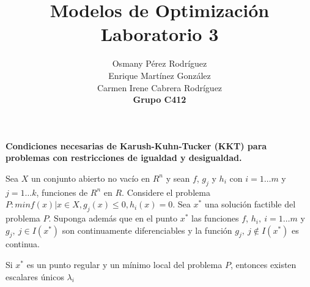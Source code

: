 \documentclass[titlepage, 11pt]{scrartcl}
\title{
    \normalfont\normalsize
    {\huge Modelos de Optimización\\
    		\textbf{Laboratorio 3}}
    \vspace{12pt}
}
\author{Osmany P\'erez Rodr\'iguez\\
		Enrique Mart\'inez Gonz\'alez\\
		Carmen Irene Cabrera Rodr\'iguez\\
		\textbf{Grupo C412}}
\date{}
\begin{document}
    \maketitle 
    
	\textbf{Condiciones necesarias de Karush-Kuhn-Tucker (KKT) para problemas con restricciones de igualdad y desigualdad.}
	
	Sea $X$ un conjunto abierto no vacío en $R^n$ y sean $f$, $g_j$ y $h_i$ con $i = 1 \ldots m$ y $j = 1\ldots k$, funciones de $R^n$ en $R$. Considere el problema $P: min{f(x) | x \in X, g_j(x) \leq 0, h_i(x) = 0}$. Sea $x^*$ una solución factible del problema $P$. Suponga además que en el punto $x^*$ las funciones $f$, $h_i , \ i = 1 \ldots m$ y $g_j, \ j \in I(x^*)$ son continuamente diferenciables y la función $g_j, \ j\notin I(x^*)$ es continua.
	
	Si $x^*$ es un punto regular y un mínimo local del problema $P$, entonces existen escalares únicos $\lambda_i$
\end{document}
